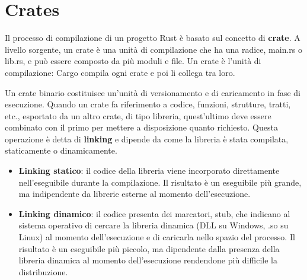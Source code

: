 


\section{Crates}

Il processo di compilazione di un progetto Rust è basato sul concetto di
\textbf{crate}. A livello sorgente, un crate è una unità di compilazione che ha
una radice, main.rs o lib.rs, e può essere composto da più moduli e file.
Un crate è l'unità di compilazione: Cargo compila ogni crate e poi li collega
tra loro.




Un crate binario costituisce un'unità di versionamento e di caricamento in fase
di esecuzione. Quando un crate fa riferimento a codice, funzioni, strutture,
tratti, etc., esportato da un altro crate, di tipo libreria, quest'ultimo
deve essere combinato con il primo per mettere a disposizione quanto richiesto.
Questa operazione è detta di \textbf{linking} e dipende da come la libreria
è stata compilata, staticamente o dinamicamente.


\begin{itemize}
  \item \textbf{Linking statico}: il codice della libreria viene incorporato
        direttamente nell'eseguibile durante la compilazione. Il risultato è un
        eseguibile più grande, ma indipendente da librerie esterne al momento
        dell'esecuzione.
  \item \textbf{Linking dinamico}: il codice presenta dei marcatori, stub, che
        indicano al sistema operativo di cercare la libreria dinamica (DLL su Windows,
        .so su Linux) al momento dell'esecuzione e di caricarla nello spazio del
        processo. Il risultato è un eseguibile più piccolo, ma dipendente dalla
        presenza della libreria dinamica al momento dell'esecuzione rendendone più
        difficile la distribuzione.
\end{itemize}

